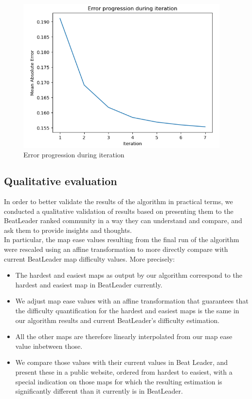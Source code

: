 \documentclass[12pt,a4paper]{article}
\begin{document}
\begin{figure}
\caption{\label{error_iteration}Error progression during iteration}
\includegraphics[width=0.95\textwidth]{error_iteration.png}
\centering
\end{figure}

\subsection{Qualitative evaluation}

In order to better validate the results of the algorithm in practical terms, we conducted a qualitative validation of results based on presenting them to the BeatLeader ranked community in a way they can understand and compare, and ask them to provide insights and thoughts.\\

In particular, the map ease values resulting from the final run of the algorithm were rescaled using an affine transformation to more directly compare with current BeatLeader map difficulty values. More precisely:

\begin{itemize}

\item The hardest and easiest maps as output by our algorithm correspond to the hardest and easiest map in BeatLeader currently.
\item We adjust map ease values with an affine transformation that guarantees that the difficulty quantification for the hardest and easiest maps is the same in our algorithm results and current BeatLeader's difficulty estimation.
\item All the other maps are therefore linearly interpolated from our map ease value inbetween those.
\item We compare those values with their current values in Beat Leader, and present these in a public website, ordered from hardest to easiest, with a special indication on those maps for which the resulting estimation is significantly different than it currently is in BeatLeader.

\end{itemize}
\end{document}
